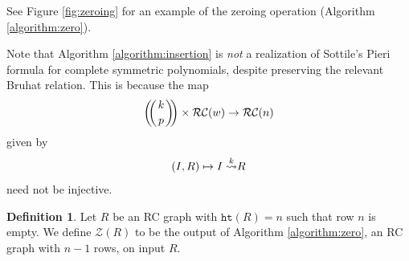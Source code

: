 \documentclass[a4paper,fleqn]{cas-sc}
\theoremstyle{definition}
\newtheorem{definition}[lemma]{Definition}
\theoremstyle{remark}
\numberwithin{equation}{subsection}
\newcommand{\zeromap}{\mathcal{Z}}
\newcommand{\hr}{\mathtt{ht}}
\newcommand{\RC}{\mathcal{RC}}
\begin{document}
See Figure \ref{fig:zeroing} for an example of the zeroing operation (Algorithm \ref{algorithm:zero}). 

\def\multiset#1#2{\ensuremath{\left(\kern-.3em\left(\genfrac{}{}{0pt}{}{#1}{#2}\right)\kern-.3em\right)}}


Note that Algorithm \ref{algorithm:insertion} is \emph{not} a realization of Sottile's Pieri formula for complete symmetric polynomials, despite preserving the relevant Bruhat relation. This is because the map 
$$\multiset{k}{p}\times\RC(w)\to \RC(n)$$
given by 
$$(I, R)\mapsto \ins{k}{I} R$$ 
need not be injective.

\begin{definition}\label{definition:zeromap}
Let $R$ be an RC graph with $\hr(R) = n$ such that row $n$ is empty. We define $\zeromap(R)$ to be the output of Algorithm \ref{algorithm:zero}, an RC graph with $n-1$ rows, on input $R$.
\end{definition}
\end{document}
